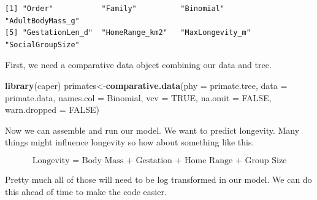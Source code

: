 \documentclass[
]{book}
\newenvironment{Shaded}{\begin{snugshade}}{\end{snugshade}}
\newcommand{\DataTypeTok}[1]{\textcolor[rgb]{0.13,0.29,0.53}{#1}}
\newcommand{\KeywordTok}[1]{\textcolor[rgb]{0.13,0.29,0.53}{\textbf{#1}}}
\newcommand{\NormalTok}[1]{#1}
\newcommand{\OperatorTok}[1]{\textcolor[rgb]{0.81,0.36,0.00}{\textbf{#1}}}
\newcommand{\OtherTok}[1]{\textcolor[rgb]{0.56,0.35,0.01}{#1}}
\newcommand{\StringTok}[1]{\textcolor[rgb]{0.31,0.60,0.02}{#1}}
\begin{document}
\begin{verbatim}
[1] "Order"           "Family"          "Binomial"        "AdultBodyMass_g"
[5] "GestationLen_d"  "HomeRange_km2"   "MaxLongevity_m"  "SocialGroupSize"
\end{verbatim}

First, we need a comparative data object combining our data and tree.

\begin{Shaded}
\begin{Highlighting}[]
\KeywordTok{library}\NormalTok{(caper)}
\NormalTok{primates\textless{}{-}}\KeywordTok{comparative.data}\NormalTok{(}\DataTypeTok{phy =}\NormalTok{ primate.tree, }\DataTypeTok{data =}\NormalTok{ primate.data, }
                           \DataTypeTok{names.col =}\NormalTok{ Binomial, }\DataTypeTok{vcv =} \OtherTok{TRUE}\NormalTok{, }
                           \DataTypeTok{na.omit =} \OtherTok{FALSE}\NormalTok{, }\DataTypeTok{warn.dropped =} \OtherTok{FALSE}\NormalTok{)}
\end{Highlighting}
\end{Shaded}

Now we can assemble and run our model. We want to predict longevity. Many things might influence longevity so how about something like this.

\[ \text{Longevity = Body Mass + Gestation + Home Range + Group Size}\]

Pretty much all of those will need to be log transformed in our model. We can do this ahead of time to make the code easier.

\begin{Shaded}
\end{Shaded}
\end{document}
